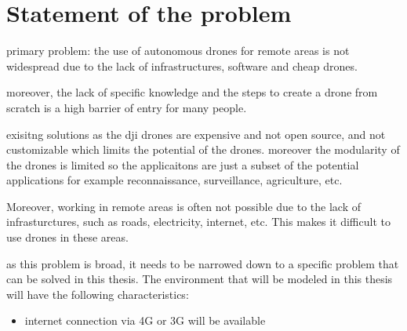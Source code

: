 \chapter{Statement of the problem}

primary problem: the use of autonomous drones for remote areas is not widespread due to the lack of infrastructures, software and cheap drones.

moreover, the lack of specific knowledge and the steps to create a drone from scratch is a high barrier of entry for many people.

exisitng solutions as the dji drones are expensive and not open source, and not customizable which limits the potential of the drones. moreover the modularity of the drones is limited so the applicaitons are just a subset of the potential applications for example reconnaissance, surveillance, agriculture, etc.

Moreover, working in remote areas is often not possible due to the lack of infrasturctures, such as roads, electricity, internet, etc. This makes it difficult to use drones in these areas.

as this problem is broad, it needs to be narrowed down to a specific problem that can be solved in this thesis. The environment that will be modeled in this thesis will have the following characteristics:

\begin{itemize}
  \item internet connection via 4G or 3G will be available
\end{itemize}
